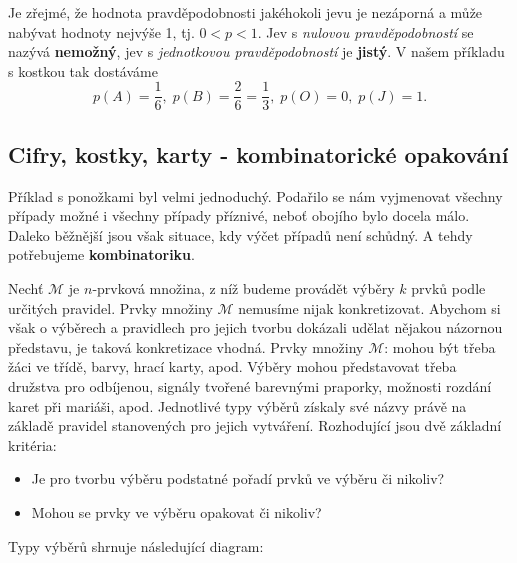       Je zřejmé, že hodnota pravděpodobnosti jakéhokoli jevu je nezáporná a může nabývat hodnoty 
      nejvýše \num{1}, tj. \(0 <p< 1\). Jev s \emph{nulovou pravděpodobností} se nazývá 
      \textbf{nemožný}, jev s \emph{jednotkovou pravděpodobností} je \textbf{jistý}. V našem 
      příkladu s kostkou tak dostáváme
      \begin{equation*}
        p(A) = \frac{1}{6}, \; p(B) = \frac{2}{6} = \frac{1}{3}, \; p(O) = 0, \; p(J) = 1.
      \end{equation*}  

      
    \subsection{Cifry, kostky, karty - kombinatorické opakování}\label{mai:IchapIVsecIIssecII}
      Příklad s ponožkami byl velmi jednoduchý. Podařilo se nám vyjmenovat všechny případy možné i 
      všechny případy příznivé, neboť obojího bylo docela málo. Daleko běžnější jsou však situace, 
      kdy výčet případů není schůdný. A tehdy potřebujeme \textbf{kombinatoriku}.
      
      Nechť \(\mathcal{M}\) je \(n\)-prvková množina, z níž budeme provádět výběry \(k\) prvků 
      podle určitých pravidel. Prvky množiny \(\mathcal{M}\) nemusíme nijak konkretizovat. Abychom 
      si však o výběrech a pravidlech pro jejich tvorbu dokázali udělat nějakou názornou představu, 
      je taková konkretizace vhodná. Prvky množiny \(\mathcal{M}\): mohou být třeba žáci ve třídě, 
      barvy, hrací karty, apod. Výběry mohou představovat třeba družstva pro odbíjenou, signály 
      tvořené barevnými praporky, možnosti rozdání karet při mariáši, apod. Jednotlivé typy výběrů 
      získaly své názvy právě na základě pravidel stanovených pro jejich vytváření. Rozhodující 
      jsou dvě základní kritéria:
      \begin{itemize}[noitemsep]
        \item Je pro tvorbu výběru podstatné pořadí prvků ve výběru či nikoliv?
        \item Mohou se prvky ve výběru opakovat či nikoliv?
      \end{itemize}
      
      Typy výběrů shrnuje následující diagram:

